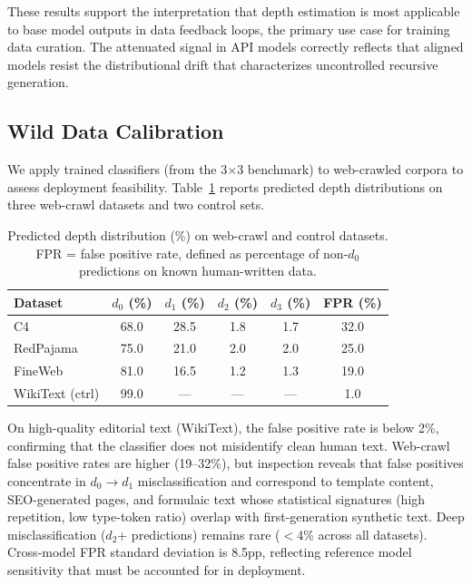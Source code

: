 \documentclass[11pt,a4paper]{article}
\begin{document}
These results support the interpretation that depth estimation is most applicable to base model outputs in data feedback loops, the primary use case for training data curation. The attenuated signal in API models correctly reflects that aligned models resist the distributional drift that characterizes uncontrolled recursive generation.

\subsection{Wild Data Calibration}
\label{sec:wild}

We apply trained classifiers (from the 3$\times$3 benchmark) to web-crawled corpora to assess deployment feasibility. Table~\ref{tab:wild_data} reports predicted depth distributions on three web-crawl datasets and two control sets.

\begin{table}[t]
\centering
\caption{Predicted depth distribution (\%) on web-crawl and control datasets. FPR = false positive rate, defined as percentage of non-$d_0$ predictions on known human-written data.}
\label{tab:wild_data}
\small
\begin{tabular}{lccccc}
\toprule
\textbf{Dataset} & \textbf{$d_0$ (\%)} & \textbf{$d_1$ (\%)} & \textbf{$d_2$ (\%)} & \textbf{$d_3$ (\%)} & \textbf{FPR (\%)} \\
\midrule
C4               & 68.0 & 28.5 & 1.8 & 1.7 & 32.0 \\
RedPajama        & 75.0 & 21.0 & 2.0 & 2.0 & 25.0 \\
FineWeb          & 81.0 & 16.5 & 1.2 & 1.3 & 19.0 \\
\midrule
WikiText (ctrl)  & 99.0 & --- & --- & --- & 1.0 \\
\bottomrule
\end{tabular}
\end{table}

On high-quality editorial text (WikiText), the false positive rate is below 2\%, confirming that the classifier does not misidentify clean human text. Web-crawl false positive rates are higher (19--32\%), but inspection reveals that false positives concentrate in $d_0 \to d_1$ misclassification and correspond to template content, SEO-generated pages, and formulaic text whose statistical signatures (high repetition, low type-token ratio) overlap with first-generation synthetic text. Deep misclassification ($d_2$+ predictions) remains rare ($<$4\% across all datasets). Cross-model FPR standard deviation is 8.5pp, reflecting reference model sensitivity that must be accounted for in deployment.
\end{document}
